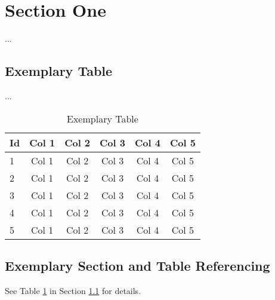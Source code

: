 \clearpage
\section{Section One}
\label{sec:Intro}
...

\subsection{Exemplary Table}
\label{subsec:Intro/table}
...

\begin{longtable}{l|ccccc}
    \caption{Exemplary Table}
    \label{table:table-1}
    \\
    \textbf{Id} & \textbf{Col 1} & \textbf{Col 2} & \textbf{Col 3} & \textbf{Col 4} & \textbf{Col 5} \\
    \hline
    1           & Col 1          & Col 2          & Col 3          & Col 4          & Col 5          \\
    2           & Col 1          & Col 2          & Col 3          & Col 4          & Col 5          \\
    3           & Col 1          & Col 2          & Col 3          & Col 4          & Col 5          \\
    4           & Col 1          & Col 2          & Col 3          & Col 4          & Col 5          \\
    5           & Col 1          & Col 2          & Col 3          & Col 4          & Col 5          \\
\end{longtable}



\subsection{Exemplary Section and Table Referencing}
\label{subsec:Intro/rfs}

See Table \ref{table:table-1} in Section \ref{subsec:Intro/table}  for details.
